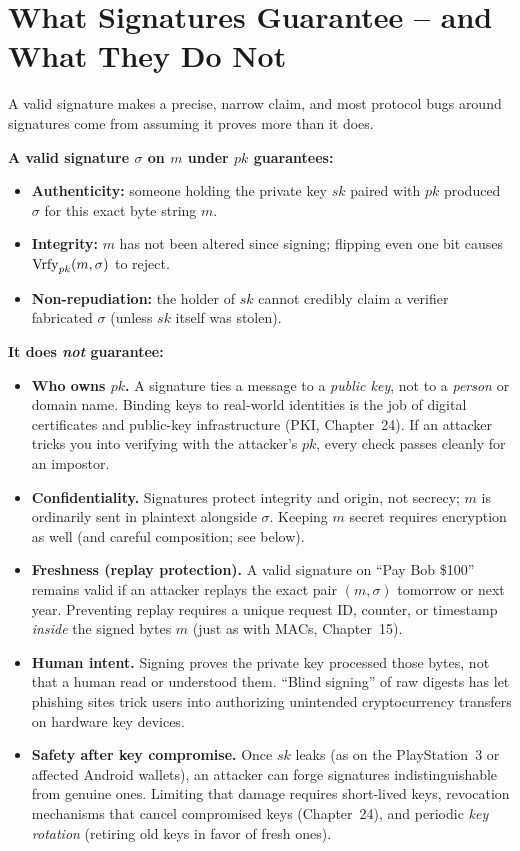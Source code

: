 \section{What Signatures Guarantee -- and What They Do Not}
\label{ch22:guarantees}

A valid signature makes a precise, narrow claim, and most protocol bugs around signatures come from assuming it proves more than it does.

\textbf{A valid signature $\sigma$ on $m$ under $pk$ guarantees:}
\begin{itemize}
  \item \textbf{Authenticity:} someone holding the private key $sk$ paired with $pk$ produced $\sigma$ for this exact byte string $m$.
  \item \textbf{Integrity:} $m$ has not been altered since signing; flipping even one bit causes $\operatorname{Vrfy}_{pk}(m, \sigma)$ to reject.
  \item \textbf{Non-repudiation:} the holder of $sk$ cannot credibly claim a verifier fabricated $\sigma$ (unless $sk$ itself was stolen).
\end{itemize}

\textbf{It does \emph{not} guarantee:}
\begin{itemize}
  \item \textbf{Who owns $pk$.} A signature ties a message to a \emph{public key}, not to a \emph{person} or domain name. Binding keys to real-world identities is the job of digital certificates and public-key infrastructure (PKI, Chapter~24). If an attacker tricks you into verifying with the attacker's $pk$, every check passes cleanly for an impostor.
  \item \textbf{Confidentiality.} Signatures protect integrity and origin, not secrecy; $m$ is ordinarily sent in plaintext alongside $\sigma$. Keeping $m$ secret requires encryption as well (and careful composition; see below).
  \item \textbf{Freshness (replay protection).} A valid signature on ``Pay Bob \$100'' remains valid if an attacker replays the exact pair $(m, \sigma)$ tomorrow or next year. Preventing replay requires a unique request ID, counter, or timestamp \emph{inside} the signed bytes $m$ (just as with MACs, Chapter~15).
  \item \textbf{Human intent.} Signing proves the private key processed those bytes, not that a human read or understood them. ``Blind signing'' of raw digests has let phishing sites trick users into authorizing unintended cryptocurrency transfers on hardware key devices.
  \item \textbf{Safety after key compromise.} Once $sk$ leaks (as on the PlayStation~3 or affected Android wallets), an attacker can forge signatures indistinguishable from genuine ones. Limiting that damage requires short-lived keys, revocation mechanisms that cancel compromised keys (Chapter~24), and periodic \emph{key rotation} (retiring old keys in favor of fresh ones).
\end{itemize}

